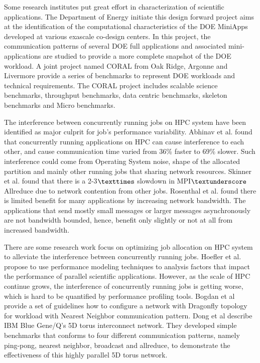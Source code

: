 \documentclass[conference]{IEEEtran}
\begin{document}
Some research institutes put great effort in characterization of scientific applications. The Department of Energy initiate this design forward project aims at the identification of the computational characteristics of the DOE MiniApps developed at various exascale co-design centers\cite{design forward webpage}. In this project, the communication patterns of several DOE full applications and associated mini-applications are studied to provide a more complete snapshot of the DOE workload. A joint project named CORAL from Oak Ridge, Argonne and Livermore provide a series of benchmarks to represent DOE workloads and technical requirements\cite{coral}. The CORAL project includes scalable science benchmarks, throughput benchmarks, data centric benchmarks, skeleton benchmarks and Micro benchmarks.  

The interference between concurrently running jobs on HPC system have been identified as major culprit for job's performance variability. Abhinav et al. found that concurrently running applications on HPC can cause interference to each other, and cause communication time varied from 36\% faster to 69\% slower. Such interference could come from Operating System noise, shape of the allocated partition and mainly other running jobs that sharing network resources\cite{abhinav-sc13}. Skinner et al. found that  there is a 2-3$\texttimes$ slowdown in MPI$\textunderscore$Allreduce due to network contention from other jobs\cite{skinner}. Rosenthal et al. found there is limited benefit for many applications by increasing network bandwidth. The applications that send mostly small messages or larger messages asynchronously are not bandwidth bounded, hence, benefit only slightly or not at all from increased bandwidth\cite{rosenthal}.

There are some research work focus on optimizing job allocation on HPC system to alleviate the interference between concurrently running jobs. Hoefler et al. propose to use performance modeling techniques to analysis factors that impact the performance of parallel scientific applications\cite{hoefler-modeling}. However, as the scale of HPC continue grows, the  interference of concurrently running jobs is getting worse, which is hard to be quantified by performance profiling tools. Bogdan et al provide a set of guidelines how to configure a network with Dragonfly topology for workload with Nearest Neighbor communication pattern\cite{Bogdan-hpdc14}. Dong et al describe IBM Blue Gene/Q's 5D torus interconnect network\cite{Dong-SC11}. They developed simple benchmarks that conforms to four different communication patterns, namely ping-pong, nearest neighbor, broadcast and allreduce, to demonstrate the effectiveness of this highly parallel 5D torus network.
\end{document}
